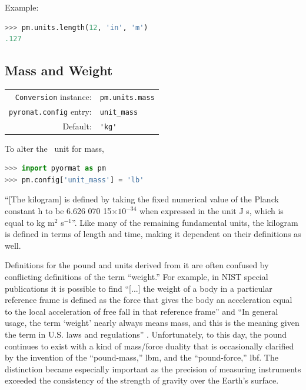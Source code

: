 Example:
\begin{lstlisting}[language=Python]
>>> pm.units.length(12, 'in', 'm')
.127
\end{lstlisting}


%
%

\subsection{Mass and Weight}\label{sec:units:mass}

\begin{tabular}{rl}
\hline
\verb|Conversion| instance: & \verb|pm.units.mass|\\
\verb|pyromat.config| entry: & \verb|unit_mass|\\
Default: & \verb|'kg'|\\
\hline
\end{tabular}
\vspace{1em}

To alter the \PM\ unit for mass,
\begin{lstlisting}[language=Python]
>>> import pyormat as pm
>>> pm.config['unit_mass'] = 'lb'
\end{lstlisting}

``[The kilogram] is defined by taking the fixed numerical value of the Planck constant h to be 6.626 070 15$\times 10^{-34}$ when expressed in the unit J s, which is equal to kg m$^2$ s$^{-1}$''\cite[p.131]{si:2019}.  Like many of the remaining fundamental units, the kilogram is defined in terms of length and time, making it dependent on their definitions as well.

Definitions for the pound and units derived from it are often confused by conflicting definitions of the term ``weight.''  For example, in NIST special publications it is possible to find ``[...] the  weight  of  a  body  in  a  particular  reference  frame  is  defined  as  the  force that gives the body an acceleration equal to the local acceleration of free fall in that reference frame''\cite[p.23]{nist:sp811} and ``In general usage, the term `weight' nearly always means mass, and this is the meaning given the term in U.S. laws and regulations'' \cite[p.10]{nist:sp1038}.  Unfortunately, to this day, the pound continues to exist with a kind of mass/force duality that is occasionally clarified by the invention of the ``pound-mass,'' lbm, and the ``pound-force,'' lbf.  The distinction became especially important as the precision of measuring instruments exceeded the consistency of the strength of gravity over the Earth's surface.  

